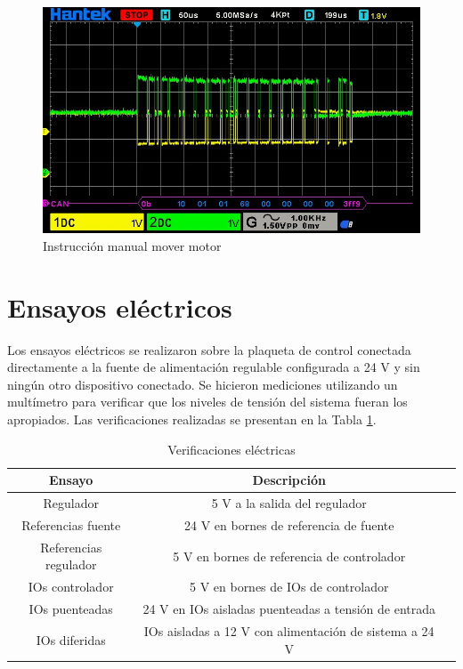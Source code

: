 \begin{figure}[htbp]
	\centering
	\includegraphics[scale=0.6]{./Figures/Motor_Manual_Move_CCW_360DEG.jpg}
	\caption{Instrucción manual mover motor}
	\label{fig:mot_move}
\end{figure}


\section{Ensayos eléctricos}

Los ensayos eléctricos se realizaron sobre la plaqueta de control conectada directamente a la fuente de alimentación regulable configurada a 24 V y sin ningún otro dispositivo conectado. Se hicieron mediciones utilizando un multímetro para verificar que los niveles de tensión del sistema fueran los apropiados. Las verificaciones realizadas se presentan en la Tabla \ref{tab:verificaciones_electricas}.

\begin{table}[h]
	\centering
	\caption[Verificaciones eléctricas]{Verificaciones eléctricas}
	\begin{tabular}{c c c}    
		\toprule
		\textbf{Ensayo} 	 & 		\textbf{Descripción} \\
		\midrule
		Regulador & 5 V a la salida del regulador\\
		Referencias fuente & 24 V en bornes de referencia de fuente \\
		Referencias regulador & 5 V en bornes de referencia de controlador \\
		IOs controlador & 5 V en bornes de IOs de controlador \\		
		IOs puenteadas 	& 24 V en IOs aisladas puenteadas a tensión de entrada \\
		IOs	diferidas	& IOs aisladas a 12 V con alimentación de sistema a 24 V \\
		\bottomrule
		\hline
	\end{tabular}
	\label{tab:verificaciones_electricas}
\end{table} 

